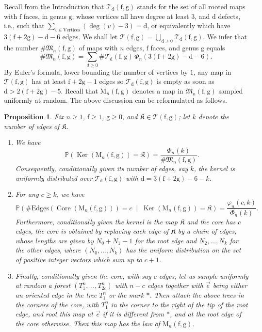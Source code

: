 \documentclass[11pt]{article}
\newcommand{\ie}{i.e.,\xspace}
\theoremstyle{plain}
\newtheorem{proposition}[theorem]{Proposition}
\theoremstyle{definition}
\theoremstyle{remark}
\renewcommand{\P}{\mathbb{P}}
\newcommand{\Map}{\mathrm{M}}
\newcommand{\face}{\mathrm{f}}
\newcommand{\defect}{\mathrm{d}}
\newcommand{\gen}{\mathrm{g}}
\DeclareMathOperator{\Core}{Core}
\DeclareMathOperator{\Ker}{Ker}
\newcommand{\kernel}{\mathfrak{K}}
\begin{document}
Recall from the Introduction that
$\mathcal{T}_{\defect}(\face,\gen)$ stands for the set of all rooted maps with $ \face$ faces, in genus $ \gen$, whose vertices all have degree at least $3$, and $\defect$ defects, \ie such that $\sum_{v \in \mathrm{Vertices}} (\deg(v)-3) = \defect$, or equivalently which have $3(\face+2\gen) - \defect - 6$ edges.
We shall let $\mathcal{T}(\face,\gen) = \bigcup_{\defect \ge 0} \mathcal{T}_{\defect}(\face,\gen)$.
We infer that the number $\#\mathfrak{M}_n(\face,\gen)$ of maps with $n$ edges, $\face$ faces, and genus $\gen$ equals
\[
\#\mathfrak{M}_n(\face,\gen) = \sum_{d \ge 0} \# \mathcal{T}_{\defect}(\face,\gen)\, \Phi_n(3(\face+2\gen) - \defect - 6).
\]
By Euler's formula, lower bounding the number of vertices by $1$, any map in $\mathcal{T}(\face,\gen)$ has at least $\face+2\gen-1$ edges so $\mathcal{T}_{\defect}(\face,\gen)$ is empty as soon as $\defect > 2(\face+2\gen)-5$.
Recall that $\Map_{n}(\face,\gen)$ denotes a map in $\mathfrak{M}_n(\face,\gen)$ sampled uniformly at random.
The above discussion can be reformulated as follows.

\begin{proposition}\label{prop:loi_core_kernel}
Fix $n\ge1$, $\face \geq 1$, $\gen\ge0$, and $\kernel \in \mathcal{T}(\face,\gen)$; let $k$ denote the number of edges of $\kernel$.
\begin{enumerate}
\item We have
\[
\P \left(\Ker(\Map_n(\face,\gen)) = \kernel \right) = \frac{\Phi_{n}(k)}{\# \mathfrak{M}_n(\face,\gen)}.
\]
Consequently, conditionally given its number of edges, say
$k$, the kernel is uniformly distributed over $\mathcal{T}_\defect(\face,\gen)$ with $\defect=3(\face+2\gen)-6-k$.

\item For any $c \geq k$, we have
\[
\P \left(\#\mathrm{Edges}(\Core(\Map_n(\face,\gen))) = c \;\middle|\; \Ker(\Map_n(\face,\gen)) = \kernel \right) = \frac{\varphi_{n}(c,k)}{\Phi_{n}(k)}.
\]
Furthermore, conditionally given
the kernel is the map $\kernel$ and the core has $c$ edges, the core is obtained by replacing each edge of $\kernel$ by a chain of edges,
whose lengths are given by $N_0+N_1-1$ for the root edge and $N_2, \dots, N_k$ for the other edges, where $(N_0, \dots, N_k)$ has the uniform distribution on the set of positive integer vectors which sum up to $c+1$.

\item Finally, conditionally given the core, with say $c$ edges, let us sample uniformly at random a forest $(T^n_{1}, \dots, T^n_{2c})$ with $n-c$ edges together with $\vec{e}$ being either an oriented edge in the tree $T^n_1$ or the mark $\ast$.
Then attach the above trees in the corners of the core, with $T^n_1$ in the corner to the right of the tip of the root edge, and root this map at $\vec{e}$ if it is different from $\ast$, and at the root edge of the core otherwise. Then this map has the law of $\Map_n(\face,\gen)$.
\end{enumerate}
\end{proposition}
\end{document}

